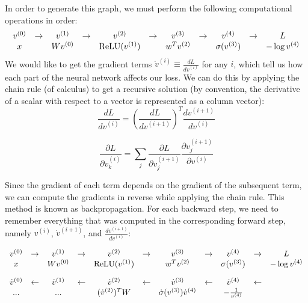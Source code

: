 \documentclass{article}
\begin{document}
\noindent
In order to generate this graph, we must perform the following computational operations in order:
\[
\begin{array}{*{11}c}
v^{(0)} & \rightarrow & v^{(1)} & \rightarrow & v^{(2)} & \rightarrow & v^{(3)} & \rightarrow & v^{(4)} & \rightarrow & L\\
x && Wv^{(0)} && \text{ReLU}(v^{(1)}) && w^Tv^{(2)} && \sigma(v^{(3)}) && -\log{v^{(4)}}\\
\end{array}
\]
We would like to get the gradient terms $\dot{v}^{(i)} \equiv \frac{d L}{d v^{(i)}}$ for any $i$, which tell us how each part of the neural network affects our loss. We can do this by applying the chain rule (of calculus) to get a recursive solution (by convention, the derivative of a scalar with respect to a vector is represented as a column vector):
\[
\frac{d L}{d v^{(i)}} = \left( \frac{d L}{d v^{(i+1)}}\right)^T \frac{d v^{(i+1)}}{d v^{(i)}}
\]

\[
\frac{\partial L}{\partial v_k^{(i)}} = \sum_j \frac{\partial L}{\partial v_j^{(i+1)}} \frac{\partial v_j^{(i+1)}}{\partial v^(i)}
\]

\noindent
Since the gradient of each term depends on the gradient of the subsequent term, we can compute the gradients in reverse while applying the chain rule. This method is known as backpropagation. For each backward step, we need to remember everything that was computed in the corresponding forward step, namely $v^{(i)}$, $\dot{v}^{(i+1)}$, and $\frac{d v^{(i+1)}}{d v^{(i)}}$:

\[
\begin{array}{*{11}c}
v^{(0)} & \rightarrow & v^{(1)} & \rightarrow & v^{(2)} & \rightarrow & v^{(3)} & \rightarrow & v^{(4)} & \rightarrow & L\\
\vspace{.35cm}
x && Wv^{(0)} && \text{ReLU}(v^{(1)}) && w^Tv^{(2)} && \sigma(v^{(3)}) && -\log{v^{(4)}}\\
\dot{v}^{(0)} & \leftarrow & \dot{v}^{(1)} & \leftarrow & \dot{v}^{(2)} & \leftarrow & \dot{v}^{(3)} & \leftarrow & \dot{v}^{(4)} & \leftarrow &\\
...&&...&& (\dot{v}^{(2)})^T W &&\dot{\sigma}(v^{(3)})\dot{v}^{(4)}&&-\frac{1}{v^{(4)}}&&
\end{array}
\]
\end{document}
